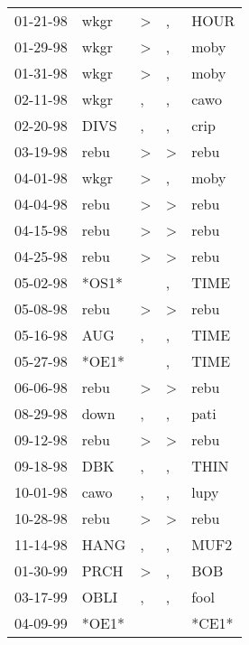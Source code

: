 \begin{supertabular}{lllll}
 01-21-98 &   wkgr &     \textgreater &                , &   HOUR \\
 01-29-98 &   wkgr &     \textgreater &                , &   moby \\
 01-31-98 &   wkgr &     \textgreater &                , &   moby \\
 02-11-98 &   wkgr &                , &                , &   cawo \\
 02-20-98 &   DIVS &                , &                , &   crip \\
 03-19-98 &   rebu &     \textgreater &     \textgreater &   rebu \\
 04-01-98 &   wkgr &     \textgreater &                , &   moby \\
 04-04-98 &   rebu &     \textgreater &     \textgreater &   rebu \\
 04-15-98 &   rebu &     \textgreater &     \textgreater &   rebu \\
 04-25-98 &   rebu &     \textgreater &     \textgreater &   rebu \\
 05-02-98 &  *OS1* &                  &                , &   TIME \\
 05-08-98 &   rebu &     \textgreater &     \textgreater &   rebu \\
 05-16-98 &    AUG &                , &                , &   TIME \\
 05-27-98 &  *OE1* &                  &                , &   TIME \\
 06-06-98 &   rebu &     \textgreater &     \textgreater &   rebu \\
 08-29-98 &   down &                , &                , &   pati \\
 09-12-98 &   rebu &     \textgreater &     \textgreater &   rebu \\
 09-18-98 &    DBK &                , &                , &   THIN \\
 10-01-98 &   cawo &                , &                , &   lupy \\
 10-28-98 &   rebu &     \textgreater &     \textgreater &   rebu \\
 11-14-98 &   HANG &                , &                , &   MUF2 \\
 01-30-99 &   PRCH &     \textgreater &                , &    BOB \\
 03-17-99 &   OBLI &                , &                , &   fool \\
 04-09-99 &  *OE1* &                  &                  &  *CE1* \\

\end{supertabular}
